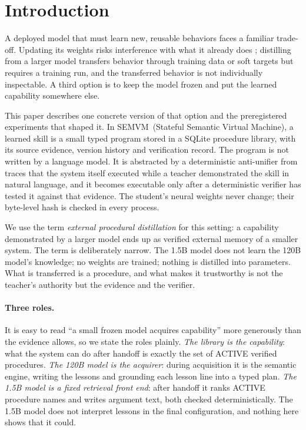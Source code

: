 \documentclass[10pt]{article}
\newcommand{\semvm}{SEMVM}
\begin{document}
\section{Introduction}\label{sec:intro}

A deployed model that must learn new, reusable behaviors faces a familiar trade-off. Updating its weights risks interference with what it already does \citep{mccloskey1989catastrophic, kirkpatrick2017ewc}; distilling from a larger model transfers behavior through training data or soft targets \citep{hinton2015distilling, kim2016sequence, hsieh2023distilling} but requires a training run, and the transferred behavior is not individually inspectable. A third option is to keep the model frozen and put the learned capability somewhere else.

This paper describes one concrete version of that option and the preregistered experiments that shaped it. In \semvm\ (Stateful Semantic Virtual Machine), a learned skill is a small typed program stored in a SQLite procedure library, with its source evidence, version history and verification record. The program is not written by a language model. It is abstracted by a deterministic anti-unifier from traces that the system itself executed while a teacher demonstrated the skill in natural language, and it becomes executable only after a deterministic verifier has tested it against that evidence. The student's neural weights never change; their byte-level hash is checked in every process.

We use the term \emph{external procedural distillation} for this setting: a capability demonstrated by a larger model ends up as verified external memory of a smaller system. The term is deliberately narrow. The 1.5B model does not learn the 120B model's knowledge; no weights are trained; nothing is distilled into parameters. What is transferred is a procedure, and what makes it trustworthy is not the teacher's authority but the evidence and the verifier.

\paragraph{Three roles.} It is easy to read ``a small frozen model acquires capability'' more generously than the evidence allows, so we state the roles plainly. \emph{The library is the capability}: what the system can do after handoff is exactly the set of ACTIVE verified procedures. \emph{The 120B model is the acquirer}: during acquisition it is the semantic engine, writing the lessons and grounding each lesson line into a typed plan. \emph{The 1.5B model is a fixed retrieval front end}: after handoff it ranks ACTIVE procedure names and writes argument text, both checked deterministically. The 1.5B model does not interpret lessons in the final configuration, and nothing here shows that it could.
\end{document}
